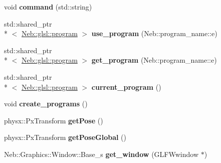 \begin{DoxyCompactItemize}
\item 
\hypertarget{classNeb_1_1App_1_1Base_add6e387b326940dc524ed6cd9d5d76db}{void {\bfseries command} (std\-::string)}\label{classNeb_1_1App_1_1Base_add6e387b326940dc524ed6cd9d5d76db}

\item 
\hypertarget{classNeb_1_1App_1_1Base_ad1b379ac9a17366de1f53859fdf56eff}{std\-::shared\-\_\-ptr\\*
$<$ \hyperlink{classNeb_1_1glsl_1_1program}{Neb\-::glsl\-::program} $>$ {\bfseries use\-\_\-program} (Neb\-::program\-\_\-name\-::e)}\label{classNeb_1_1App_1_1Base_ad1b379ac9a17366de1f53859fdf56eff}

\item 
\hypertarget{classNeb_1_1App_1_1Base_a87ec2d1ee35f0a54746b445400d09da0}{std\-::shared\-\_\-ptr\\*
$<$ \hyperlink{classNeb_1_1glsl_1_1program}{Neb\-::glsl\-::program} $>$ {\bfseries get\-\_\-program} (Neb\-::program\-\_\-name\-::e)}\label{classNeb_1_1App_1_1Base_a87ec2d1ee35f0a54746b445400d09da0}

\item 
\hypertarget{classNeb_1_1App_1_1Base_afb7f83fe4804b67c2ec09980f012bf24}{std\-::shared\-\_\-ptr\\*
$<$ \hyperlink{classNeb_1_1glsl_1_1program}{Neb\-::glsl\-::program} $>$ {\bfseries current\-\_\-program} ()}\label{classNeb_1_1App_1_1Base_afb7f83fe4804b67c2ec09980f012bf24}

\item 
\hypertarget{classNeb_1_1App_1_1Base_a8aaee8b061c48ae6eeb997bf9393aa62}{void {\bfseries create\-\_\-programs} ()}\label{classNeb_1_1App_1_1Base_a8aaee8b061c48ae6eeb997bf9393aa62}

\item 
\hypertarget{classNeb_1_1App_1_1Base_a7cbbae817434580b497ace5b6afb6283}{physx\-::\-Px\-Transform {\bfseries get\-Pose} ()}\label{classNeb_1_1App_1_1Base_a7cbbae817434580b497ace5b6afb6283}

\item 
\hypertarget{classNeb_1_1App_1_1Base_a3cd18fcee50a8fb487155f7bb9822d97}{physx\-::\-Px\-Transform {\bfseries get\-Pose\-Global} ()}\label{classNeb_1_1App_1_1Base_a3cd18fcee50a8fb487155f7bb9822d97}

\item 
\hypertarget{classNeb_1_1App_1_1Base_a3c200a59a2141594b8ad6adcb6e8b7c9}{Neb\-::\-Graphics\-::\-Window\-::\-Base\-\_\-s {\bfseries get\-\_\-window} (G\-L\-F\-Wwindow $\ast$)}\label{classNeb_1_1App_1_1Base_a3c200a59a2141594b8ad6adcb6e8b7c9}


\end{DoxyCompactItemize}
